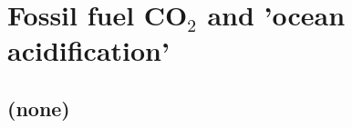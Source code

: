 
\cleardoublepage


\chapter{Fossil fuel CO$_{2}$ and 'ocean acidification'}

\hfill \break

\newpage

\section{(none)}

